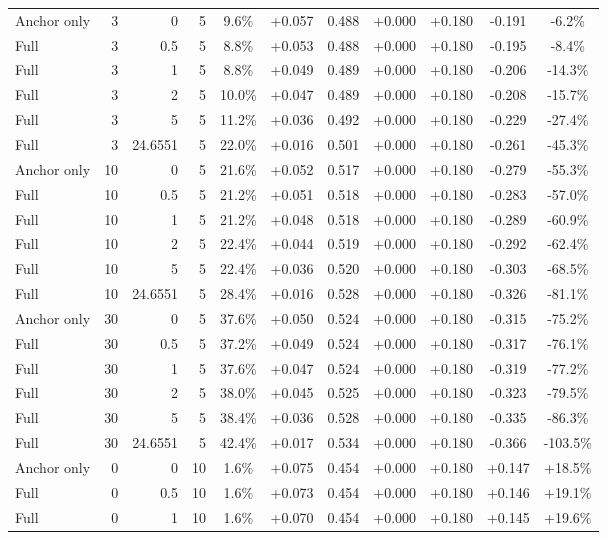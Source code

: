 \begin{table}[htbp]
\begin{tabular}{lrrrccccccc}
Anchor only & 3 & 0 & 5 & 9.6\% & +0.057 & 0.488 & +0.000 & +0.180 & -0.191 & -6.2\% \\
Full & 3 & 0.5 & 5 & 8.8\% & +0.053 & 0.488 & +0.000 & +0.180 & -0.195 & -8.4\% \\
Full & 3 & 1 & 5 & 8.8\% & +0.049 & 0.489 & +0.000 & +0.180 & -0.206 & -14.3\% \\
Full & 3 & 2 & 5 & 10.0\% & +0.047 & 0.489 & +0.000 & +0.180 & -0.208 & -15.7\% \\
Full & 3 & 5 & 5 & 11.2\% & +0.036 & 0.492 & +0.000 & +0.180 & -0.229 & -27.4\% \\
Full & 3 & 24.6551 & 5 & 22.0\% & +0.016 & 0.501 & +0.000 & +0.180 & -0.261 & -45.3\% \\
Anchor only & 10 & 0 & 5 & 21.6\% & +0.052 & 0.517 & +0.000 & +0.180 & -0.279 & -55.3\% \\
Full & 10 & 0.5 & 5 & 21.2\% & +0.051 & 0.518 & +0.000 & +0.180 & -0.283 & -57.0\% \\
Full & 10 & 1 & 5 & 21.2\% & +0.048 & 0.518 & +0.000 & +0.180 & -0.289 & -60.9\% \\
Full & 10 & 2 & 5 & 22.4\% & +0.044 & 0.519 & +0.000 & +0.180 & -0.292 & -62.4\% \\
Full & 10 & 5 & 5 & 22.4\% & +0.036 & 0.520 & +0.000 & +0.180 & -0.303 & -68.5\% \\
Full & 10 & 24.6551 & 5 & 28.4\% & +0.016 & 0.528 & +0.000 & +0.180 & -0.326 & -81.1\% \\
Anchor only & 30 & 0 & 5 & 37.6\% & +0.050 & 0.524 & +0.000 & +0.180 & -0.315 & -75.2\% \\
Full & 30 & 0.5 & 5 & 37.2\% & +0.049 & 0.524 & +0.000 & +0.180 & -0.317 & -76.1\% \\
Full & 30 & 1 & 5 & 37.6\% & +0.047 & 0.524 & +0.000 & +0.180 & -0.319 & -77.2\% \\
Full & 30 & 2 & 5 & 38.0\% & +0.045 & 0.525 & +0.000 & +0.180 & -0.323 & -79.5\% \\
Full & 30 & 5 & 5 & 38.4\% & +0.036 & 0.528 & +0.000 & +0.180 & -0.335 & -86.3\% \\
Full & 30 & 24.6551 & 5 & 42.4\% & +0.017 & 0.534 & +0.000 & +0.180 & -0.366 & -103.5\% \\
Anchor only & 0 & 0 & 10 & 1.6\% & +0.075 & 0.454 & +0.000 & +0.180 & +0.147 & +18.5\% \\
Full & 0 & 0.5 & 10 & 1.6\% & +0.073 & 0.454 & +0.000 & +0.180 & +0.146 & +19.1\% \\
Full & 0 & 1 & 10 & 1.6\% & +0.070 & 0.454 & +0.000 & +0.180 & +0.145 & +19.6\% \\

\end{tabular}
\end{table}
